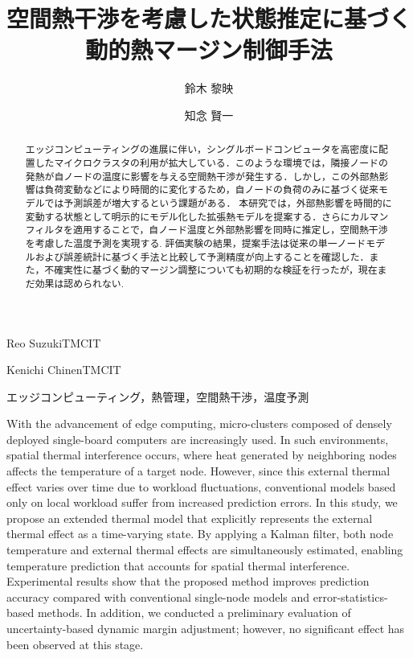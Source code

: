 \documentclass[techrep]{ipsj}
\begin{document}
\title{空間熱干渉を考慮した状態推定に基づく\\
動的熱マージン制御手法}


\author{鈴木 黎映}{Reo Suzuki}{TMCIT}
\author{知念 賢一}{Kenichi Chinen}{TMCIT}

\begin{abstract}
エッジコンピューティングの進展に伴い，シングルボードコンピュータを高密度に配置したマイクロクラスタの利用が拡大している．このような環境では，隣接ノードの発熱が自ノードの温度に影響を与える空間熱干渉が発生する．しかし，この外部熱影響は負荷変動などにより時間的に変化するため，自ノードの負荷のみに基づく従来モデルでは予測誤差が増大するという課題がある．
本研究では，外部熱影響を時間的に変動する状態として明示的にモデル化した拡張熱モデルを提案する．さらにカルマンフィルタを適用することで，自ノード温度と外部熱影響を同時に推定し，空間熱干渉を考慮した温度予測を実現する.
評価実験の結果，提案手法は従来の単一ノードモデルおよび誤差統計に基づく手法と比較して予測精度が向上することを確認した．また，不確実性に基づく動的マージン調整についても初期的な検証を行ったが，現在まだ効果は認められない.
\end{abstract}

\begin{jkeyword}
エッジコンピューティング，熱管理，空間熱干渉，温度予測
\end{jkeyword}

\begin{eabstract}
With the advancement of edge computing, micro-clusters composed of densely deployed single-board computers are increasingly used. In such environments, spatial thermal interference occurs, where heat generated by neighboring nodes affects the temperature of a target node. However, since this external thermal effect varies over time due to workload fluctuations, conventional models based only on local workload suffer from increased prediction errors.
In this study, we propose an extended thermal model that explicitly represents the external thermal effect as a time-varying state. By applying a Kalman filter, both node temperature and external thermal effects are simultaneously estimated, enabling temperature prediction that accounts for spatial thermal interference.
Experimental results show that the proposed method improves prediction accuracy compared with conventional single-node models and error-statistics-based methods. In addition, we conducted a preliminary evaluation of uncertainty-based dynamic margin adjustment; however, no significant effect has been observed at this stage.
\end{eabstract}
\end{document}
